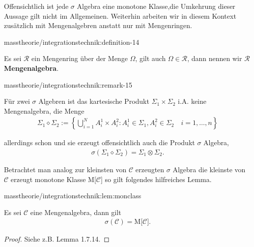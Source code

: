 \documentclass[letterpaper,10pt,german]{jupyterBook}
\begin{document}
\par
Offensichtlich ist jede \(\sigma\) Algebra eine monotone Klasse,die Umkehrung dieser Aussage gilt nicht im Allgemeinen.
Weiterhin arbeiten wir in diesem Kontext zusätzlich mit Mengenalgebren anstatt nur mit Mengenringen.
\begin{definition}{}{masstheorie/integrationstechnik:definition-14}



\par
Es sei \(\mathcal{R}\) ein Mengenring über der Menge \(\Omega\), gilt auch \(\Omega\in\mathcal{R}\), dann nennen wir \(\mathcal{R}\) \textbf{Mengenalgebra}.
\end{definition}
\begin{remark}{}{masstheorie/integrationstechnik:remark-15}



\par
Für zwei \(\sigma\) Algebren ist das kartesische Produkt \(\Sigma_1\times\Sigma_2\) i.A. keine Mengenalgebra, die Menge
\begin{align*}
\Sigma_1\diamond\Sigma_2:= \left\{\bigcup_{i=1}^N A^1_i\times A^2_i: A^1_i\in\Sigma_1, A^2_i\in\Sigma_2\quad i=1,\ldots,n\right\}
\end{align*}
\par
allerdings schon und sie erzeugt offensichtlich auch die Produkt \(\sigma\) Algebra,
\begin{align*}
\sigma(\Sigma_1\diamond\Sigma_2) = \Sigma_1\otimes\Sigma_2.
\end{align*}\end{remark}

\par
Betrachtet man analog zur kleinsten von \(\mathcal{C}\) erzeugten \(\sigma\) Algebra die kleinste von \(\mathcal{C}\) erzeugt monotone Klasse \(\text{M}\big[\mathcal{C}\big]\) so gilt folgendes hilfreiches Lemma.
\begin{lemma}{}{masstheorie/integrationstechnik:lem:monclass}



\par
Es sei \(\mathcal{C}\) eine Mengenalgebra, dann gilt
\begin{align*}
\sigma(\mathcal{C}) = \text{M}\big[\mathcal{C}\big].
\end{align*}\end{lemma}

\begin{proof}
 Siehe z.B. \cite{Tao07} Lemma 1.7.14.
\end{proof}
\end{document}
